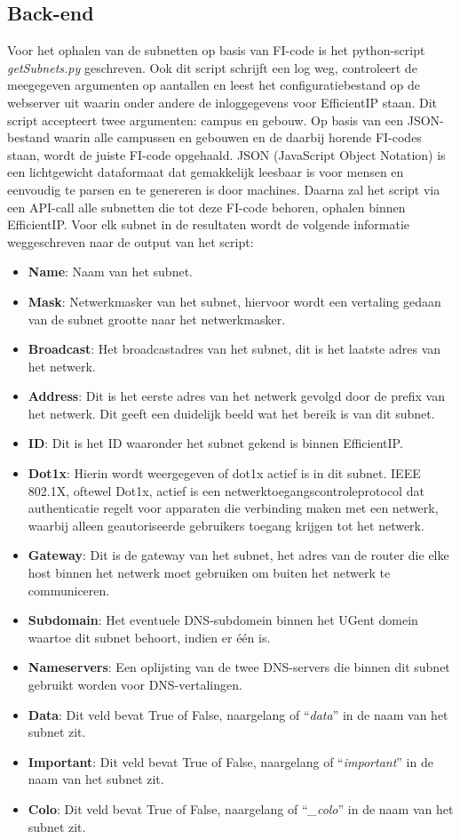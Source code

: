 \subsection{Back-end}
Voor het ophalen van de subnetten op basis van FI-code is het python-script \textit{getSubnets.py} geschreven. Ook dit script schrijft een log weg, controleert de meegegeven argumenten op aantallen en leest het configuratiebestand op de webserver uit waarin onder andere de inloggegevens voor EfficientIP staan. Dit script accepteert twee argumenten: campus en gebouw. Op basis van een JSON-bestand waarin alle campussen en gebouwen en de daarbij horende FI-codes staan, wordt de juiste FI-code opgehaald. JSON (JavaScript Object Notation) is een lichtgewicht dataformaat dat gemakkelijk leesbaar is voor mensen en eenvoudig te parsen en te genereren is door machines. Daarna zal het script via een API-call alle subnetten die tot deze FI-code behoren, ophalen binnen EfficientIP. Voor elk subnet in de resultaten wordt de volgende informatie weggeschreven naar de output van het script:
\begin{itemize}
    \item \textbf{Name}: Naam van het subnet.
    \item \textbf{Mask}: Netwerkmasker van het subnet, hiervoor wordt een vertaling gedaan van de subnet grootte naar het netwerkmasker.
    \item \textbf{Broadcast}: Het broadcastadres van het subnet, dit is het laatste adres van het netwerk.
    \item \textbf{Address}: Dit is het eerste adres van het netwerk gevolgd door de prefix van het netwerk. Dit geeft een duidelijk beeld wat het bereik is van dit subnet.
    \item \textbf{ID}: Dit is het ID waaronder het subnet gekend is binnen EfficientIP.
    \item \textbf{Dot1x}: Hierin wordt weergegeven of dot1x actief is in dit subnet. IEEE 802.1X, oftewel Dot1x, actief is een netwerktoegangscontroleprotocol dat authenticatie regelt voor apparaten die verbinding maken met een netwerk, waarbij alleen geautoriseerde gebruikers toegang krijgen tot het netwerk. %
    \item \textbf{Gateway}: Dit is de gateway van het subnet, het adres van de router die elke host binnen het netwerk moet gebruiken om buiten het netwerk te communiceren.
    \item \textbf{Subdomain}: Het eventuele DNS-subdomein binnen het UGent domein waartoe dit subnet behoort, indien er één is.
    \item \textbf{Nameservers}: Een oplijsting van de twee DNS-servers die binnen dit subnet gebruikt worden voor DNS-vertalingen.
    \item \textbf{Data}: Dit veld bevat True of False, naargelang of “\textit{data}” in de naam van het subnet zit.
    \item \textbf{Important}: Dit veld bevat True of False, naargelang of “\textit{important}” in de naam van het subnet zit.
    \item \textbf{Colo}: Dit veld bevat True of False, naargelang of “\textit{\_colo}” in de naam van het subnet zit.
\end{itemize}
